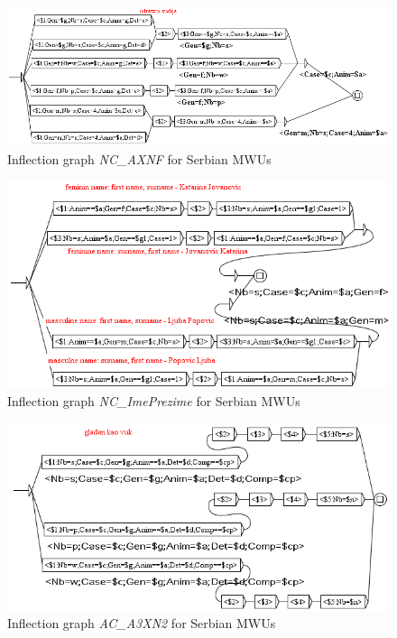 \begin{figure}[!htb]
  \centering
  \includegraphics[width=15cm]{resources/img/NC'AXNF'SRB.png}
  \caption{Inflection graph \emph{NC\_AXNF} for Serbian MWUs}
  \label{fig:NC'AXNF'SRB}
\end{figure}

\begin{figure}[!htb]
  \centering
  \includegraphics[width=15cm]{resources/img/NC'ImePrezime'SRB.png}
  \caption{Inflection graph \emph{NC\_ImePrezime} for Serbian MWUs}
  \label{fig:NC'ImePrezime'SRB}
\end{figure}

\begin{figure}[!htb]
  \centering
  \includegraphics[width=15cm]{resources/img/AC'A3XN2'SRB.png}
  \caption{Inflection graph \emph{AC\_A3XN2} for Serbian MWUs}
  \label{fig:AC'A3XN2'SRB}
\end{figure}

